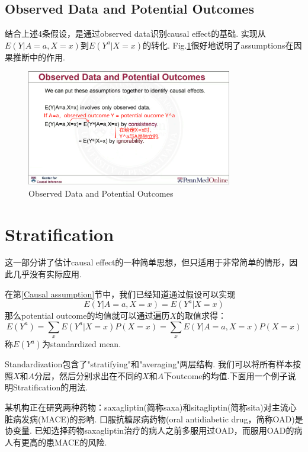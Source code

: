 \subsection{Observed Data and Potential Outcomes}
结合上述4条假设，是通过observed data识别causal effect的基础. 实现从$E(Y|A=a,X=x)$到$E(Y^a|X=x)$的转化. Fig.\ref{assump}很好地说明了assumptions在因果推断中的作用.
\begin{figure}[htbp]
	\setlength{\abovecaptionskip}{0pt}     %
	\setlength{\belowcaptionskip}{10pt}
	\vspace{-0cm}  %
	\setlength{\abovecaptionskip}{-0cm}   %
	\setlength{\belowcaptionskip}{-0cm}   %
	\centering
	\includegraphics[width=0.8\textwidth]{figure/assump.png}
	\caption{Observed Data and Potential Outcomes}
	\label{assump}
\end{figure}

\newpage \section{Stratification}
这一部分讲了估计causal effect的一种简单思想，但只适用于非常简单的情形，因此几乎没有实际应用.

在第\ref{Causal assumption}节中，我们已经知道通过假设可以实现
\begin{equation}
E(Y|A=a,X=x)=E(Y^a|X=x)
\end{equation}
那么potential outcome的均值就可以通过遍历$X$的取值求得：
\begin{equation}
E(Y^a)=\sum_{x} E(Y^a|X=x)P(X=x) =\sum_{x} E(Y|A=a,X=x)P(X=x)
\end{equation}
称$E(Y^a)$为standardized mean. 

Standardization包含了"stratifying"和"averaging"两层结构.
我们可以将所有样本按照$X$和$A$分层，然后分别求出在不同的$X$和$A$下outcome的均值.下面用一个例子说明Stratification的用法. 
\begin{ex}
某机构正在研究两种药物：saxagliptin(简称saxa)和sitagliptin(简称sita)对主流心脏病发病(MACE)的影响. 口服抗糖尿病药物(oral antidiabetic drug，简称OAD)是协变量. 已知选择药物saxagliptin治疗的病人之前多服用过OAD，而服用OAD的病人有更高的患MACE的风险.
\end{ex}

